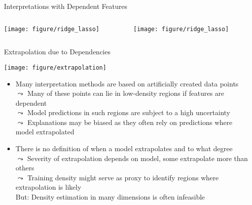 \documentclass[11pt,compress,t,notes=noshow, aspectratio=169, xcolor=table]{beamer}
\begin{document}
\begin{frame}{Interpretations with Dependent Features}
\begin{itemize}
\colorbox{blue!20}{\begin{columns}[c, totalwidth=\linewidth]
\begin{column}{0.5\linewidth}
\texttt{[image: figure/ridge\_lasso]}
\end{column}
\begin{column}{0.5\linewidth}
\texttt{[image: figure/ridge\_lasso]}
\end{column}
\end{columns}}

\end{itemize}
\end{frame}



\begin{frame}{Extrapolation due to Dependencies}
\centerline{\texttt{[image: figure/extrapolation]}}

\begin{itemize}
\item Many interpretation methods are based on
artificially created data points \\
$\leadsto$ Many of these points can lie in low-density regions if features are dependent\\
$\leadsto$ Model predictions in such regions are subject to a high uncertainty\\ %
$\leadsto$ Explanations may be biased as they often rely on predictions where model extrapolated\\
\pause
\item There is no definition of when a model extrapolates and to what degree \\
$\leadsto$ Severity of extrapolation depends on model, some extrapolate more than others \\
$\leadsto$ Training density might serve as proxy to identify regions where extrapolation is likely \\
\phantom{$\leadsto$} But: Density estimation in many dimensions is often infeasible
\end{itemize}

\end{frame}
\end{document}
